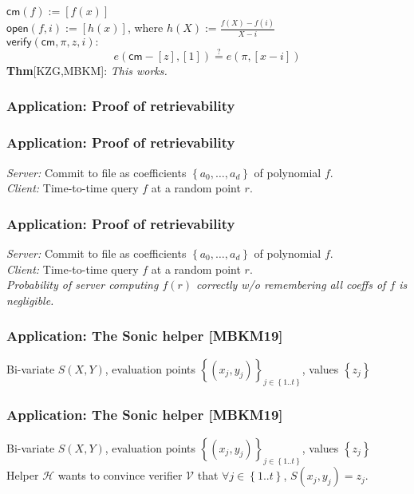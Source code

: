 \documentclass[shadesubsections,trans,14pt,mathserif]{beamer}
\newcommand{\set}[1]{\ensuremath{\left\{#1\right\}}}
\newcommand{\sett}[2]{\ensuremath{\left\{#1\right\}_{#2}}}
\newcommand{\enc}[1]{\ensuremath{\left[#1\right ]}}
\newcommand{\cm}{\ensuremath{\mathsf{cm}}}
\newcommand{\open}[1]{\ensuremath{\mathsf{open}(#1)}}
\newcommand{\verify}[1]{\ensuremath{\mathsf{verify}(#1)}}
\newcommand{\defeq}{\ensuremath{:=}}
\newcommand{\helper}{\ensuremath{\mathcal{H}}}
\newcommand{\ver}{\ensuremath{\mathcal{V}}}
\begin{document}
 


\begin{frame}

 $\cm(f)\defeq   \enc{f(x)}$\\
 \vspace{0.4in}
$\open{f,i}\defeq \enc{h(x)}$, where
 $h(X)\defeq \frac{f(X)-f(i)}{X-i}$\\
 \vspace{0.4in}
 $\verify{\cm,\pi,z,i}:$
\[e(\cm-\enc{z},\enc{1}) \stackrel{?}{=} e(\pi, \enc{x-i})\]
 \vspace{0.4in}
\textbf{Thm}{\footnotesize{[KZG,MBKM]}}: \emph{This works.}
 \end{frame}

\begin{frame}
  \frametitle{Application: Proof of retrievability}
\end{frame}

\begin{frame}
  \frametitle{Application: Proof of retrievability}
 \emph{Server:} Commit to file as coefficients \set{a_0,\ldots,a_d} of polynomial $f$.\\
 \vspace{0.4in}
 \emph{Client:} Time-to-time query $f$ at a random point $r$.\\
 \vspace{0.4in}
\end{frame}


\begin{frame}
  \frametitle{Application: Proof of retrievability}
 \emph{Server:} Commit to file as coefficients \set{a_0,\ldots,a_d} of polynomial $f$.\\
 \vspace{0.4in}
 \emph{Client:} Time-to-time query $f$ at a random point $r$.\\
 \vspace{0.4in}
 \emph{Probability of server computing $f(r)$ correctly w/o remembering all coeffs of $f$ is negligible.}
\end{frame}




\begin{frame}
  \frametitle{Application: The Sonic helper \small{[MBKM19]}}
 Bi-variate $S(X,Y)$, evaluation points \sett{(x_j,y_j)}{j\in \set{1..t}}, values \set{z_j} \\
 \end{frame}

\begin{frame}
  \frametitle{Application: The Sonic helper \small{[MBKM19]}}
 Bi-variate $S(X,Y)$, evaluation points \sett{(x_j,y_j)}{j\in \set{1..t}}, values \set{z_j} \\
 \vspace{0.4in}
 Helper $\helper$ wants to convince verifier $\ver$ that $\forall j\in \set{1..t}$, $S(x_j,y_j)=z_j$.\\
 \vspace{0.4in}
\end{frame}
\end{document}
